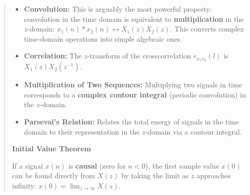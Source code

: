 \begin{quote}
\begin{itemize}
\tightlist
\item
  \textbf{Convolution:} This is arguably the most powerful property:
  convolution in the time domain is equivalent to
  \textbf{multiplication} in the \(z\)-domain:
  \(x_1(n) * x_2(n) \leftrightarrow X_1(z)X_2(z)\). This converts
  complex time-domain operations into simple algebraic ones.
\item
  \textbf{Correlation:} The \(z\)-transform of the crosscorrelation
  \(r_{x_1 x_2}(l)\) is \(X_1(z)X_2(z^{-1})\).
\item
  \textbf{Multiplication of Two Sequences:} Multiplying two signals in
  time corresponds to a \textbf{complex contour integral} (periodic
  convolution) in the \(z\)-domain.
\item
  \textbf{Parseval's Relation:} Relates the total energy of signals in
  the time domain to their representation in the \(z\)-domain via a
  contour integral.
\end{itemize}

\textbf{Initial Value Theorem}

If a signal \(x(n)\) is \textbf{causal} (zero for \(n < 0\)), the first
sample value \(x(0)\) can be found directly from \(X(z)\) by taking the
limit as \(z\) approaches infinity:
\textbf{\(x(0) = \lim_{z \to \infty} X(z)\)}.
\end{quote}

